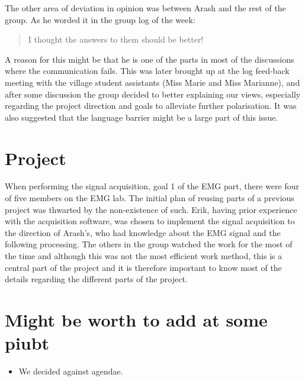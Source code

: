 The other area of deviation in opinion was between Arash and the rest of the group.
As he worded it in the group log of the week:
\begin{quote}
  I thought the answers to them should be better!
\end{quote}
A reason for this might be that he is one of the parts in most of the discussions where the communication fails.
This was later brought up at the log feed-back meeting with the village student assistants (Miss Marie and Miss Marianne), and after some discussion the group decided to better explaining our views, especially regarding the project direction and goals to alleviate further polarisation.
It was also suggested that the language barrier might be a large part of this issue.

\section{Project}
When performing the signal acquisition, goal 1 of the EMG part, there were four of five members on the EMG lab.
The initial plan of reusing parts of a previous project was thwarted by the non-existence of such.
Erik, having prior experience with the acquisition software, was chosen to implement the signal acquisition to the direction of Arash's, who had knowledge about the EMG signal and the following processing.
The others in the group watched the work for the most of the time and although this was not the most efficient work method, this is a central part of the project and it is therefore important to know most of the details regarding the different parts of the project.

\section*{Might be worth to add at some piubt}
\begin{itemize}
  \item We decided against agendae.
\end{itemize}
